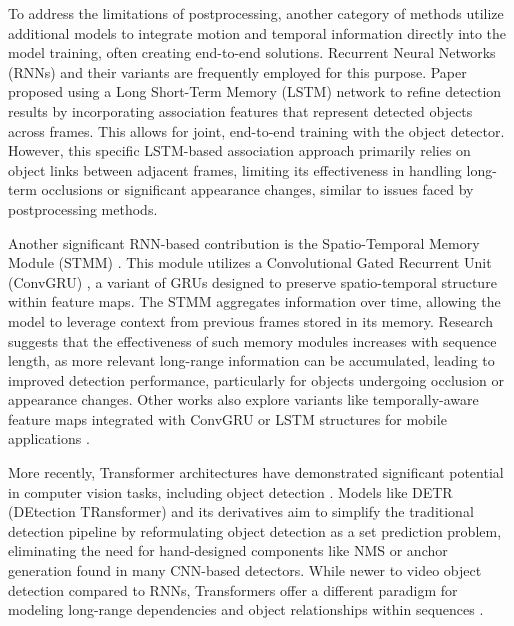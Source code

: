 To address the limitations of postprocessing, another category of methods utilize additional models to integrate motion and temporal information directly into the model training, often creating end-to-end solutions. Recurrent Neural Networks (RNNs) and their variants are frequently employed for this purpose. Paper \cite{Lu_2017_ICCV} proposed using a Long Short-Term Memory (LSTM) network \cite{6795963} to refine detection results by incorporating association features that represent detected objects across frames. This allows for joint, end-to-end training with the object detector. However, this specific LSTM-based association approach primarily relies on object links between adjacent frames, limiting its effectiveness in handling long-term occlusions or significant appearance changes, similar to issues faced by postprocessing methods.

Another significant RNN-based contribution is the Spatio-Temporal Memory Module (STMM) \cite{xiaoVideoObjectDetection2018}. This module utilizes a Convolutional Gated Recurrent Unit (ConvGRU) \cite{ballasDelvingDeeperConvolutional2016}, a variant of GRUs designed to preserve spatio-temporal structure within feature maps. The STMM aggregates information over time, allowing the model to leverage context from previous frames stored in its memory. Research suggests that the effectiveness of such memory modules increases with sequence length, as more relevant long-range information can be accumulated, leading to improved detection performance, particularly for objects undergoing occlusion or appearance changes. Other works also explore variants like temporally-aware feature maps integrated with ConvGRU or LSTM structures for mobile applications \cite{}.

More recently, Transformer architectures \cite{vaswaniAttentionAllYou2017} have demonstrated significant potential in computer vision tasks, including object detection \cite{carionEndToEndObjectDetection2020, zhuDeformableDETRDeformable2021}. Models like DETR (DEtection TRansformer) \cite{carionEndToEndObjectDetection2020, zhuDeformableDETRDeformable2021} and its derivatives aim to simplify the traditional detection pipeline by reformulating object detection as a set prediction problem, eliminating the need for hand-designed components like NMS or anchor generation found in many CNN-based detectors. While newer to video object detection compared to RNNs, Transformers offer a different paradigm for modeling long-range dependencies and object relationships within sequences \cite{wangEndtoEndVideoObject2021, shvetsTrackingObjectsAs2021}.

